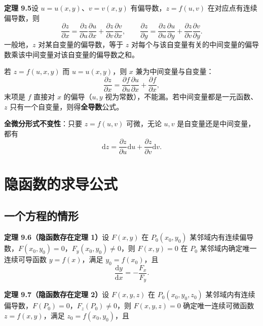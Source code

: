 \textbf{定理 9.5}\quad 设 $u=u(x,y)$、$v=v(x,y)$ 有偏导数，$z=f(u,v)$ 在对应点有连续偏导数，则
\begin{equation}
\frac{\partial z}{\partial x}=\frac{\partial z}{\partial u}\frac{\partial u}{\partial x}+\frac{\partial z}{\partial v}\frac{\partial v}{\partial x},\qquad
\frac{\partial z}{\partial y}=\frac{\partial z}{\partial u}\frac{\partial u}{\partial y}+\frac{\partial z}{\partial v}\frac{\partial v}{\partial y}.
\end{equation}
一般地，$z$ 对某自变量的偏导数，等于 $z$ 对每个与该自变量有关的中间变量的偏导数乘该中间变量对该自变量的偏导数之和。

若 $z=f(u,x,y)$ 而 $u=u(x,y)$，则 $x$ 兼为中间变量与自变量：
\begin{equation}
\frac{\partial z}{\partial x}=\frac{\partial f}{\partial u}\frac{\partial u}{\partial x}+\frac{\partial f}{\partial x},
\end{equation}
末项是 $f$ 直接对 $x$ 的偏导（$u,y$ 视为常数），不能漏。若中间变量都是一元函数、$z$ 只有一个自变量，则得\textbf{全导数}公式。

\textbf{全微分形式不变性}：只要 $z=f(u,v)$ 可微，无论 $u,v$ 是自变量还是中间变量，都有
\begin{equation}
\mathrm dz=\frac{\partial z}{\partial u}\mathrm du+\frac{\partial z}{\partial v}\mathrm dv .
\end{equation}


\section{隐函数的求导公式}

\subsection{一个方程的情形}

\textbf{定理 9.6（隐函数存在定理 1）}\quad 设 $F(x,y)$ 在 $P_0(x_0,y_0)$ 某邻域内有连续偏导数，$F(x_0,y_0)=0$，$F_y(x_0,y_0)\neq0$，则 $F(x,y)=0$ 在 $P_0$ 某邻域内确定唯一连续可导函数 $y=f(x)$，满足 $y_0=f(x_0)$，且
\begin{equation}
\frac{\mathrm dy}{\mathrm dx}=-\frac{F_x}{F_y}.
\end{equation}

\textbf{定理 9.7（隐函数存在定理 2）}\quad 设 $F(x,y,z)$ 在 $P_0(x_0,y_0,z_0)$ 某邻域内有连续偏导数，$F(P_0)=0$，$F_z(P_0)\neq0$，则 $F(x,y,z)=0$ 确定唯一连续可微函数 $z=f(x,y)$，满足 $z_0=f(x_0,y_0)$，且

